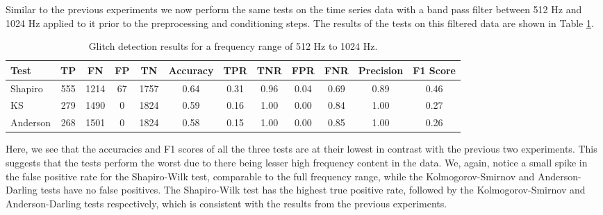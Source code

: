 \documentclass[12pt]{article}
\begin{document}
\noindent Similar to the previous experiments we now perform the same tests on the time series data with a band pass filter between 512 Hz and 1024 Hz applied to it prior to the preprocessing and conditioning steps. The results of the tests on this filtered data are shown in Table \ref{tab:high_frequency_results}.

\begin{table}[H]
  \centering
  \begin{tabular}{lccccccccccc}
  \toprule
  Test & TP & FN & FP & TN & Accuracy & TPR & TNR & FPR & FNR & Precision & F1 Score \\
  \midrule
  Shapiro & 555 & 1214 & 67 & 1757 & 0.64 & 0.31 & 0.96 & 0.04 & 0.69 & 0.89 & 0.46 \\
  KS & 279 & 1490 & 0 & 1824 & 0.59 & 0.16 & 1.00 & 0.00 & 0.84 & 1.00 & 0.27 \\
  Anderson & 268 & 1501 & 0 & 1824 & 0.58 & 0.15 & 1.00 & 0.00 & 0.85 & 1.00 & 0.26 \\
  \bottomrule
  \end{tabular}
  \caption{Glitch detection results for a frequency range of 512 Hz to 1024 Hz.}
  \label{tab:high_frequency_results}
\end{table}

\noindent Here, we see that the accuracies and F1 scores of all the three tests are at their lowest in contrast with the previous two experiments. This suggests that the tests perform the worst due to there being lesser high frequency content in the data. We, again, notice a small spike in the false positive rate for the Shapiro-Wilk test, comparable to the full frequency range, while the Kolmogorov-Smirnov and Anderson-Darling tests have no false positives. The Shapiro-Wilk test has the highest true positive rate, followed by the Kolmogorov-Smirnov and Anderson-Darling tests respectively, which is consistent with the results from the previous experiments.
\end{document}
